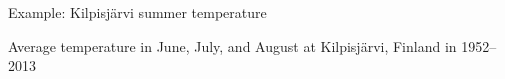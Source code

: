 \documentclass[english,t]{beamer}
\begin{document}
\begin{frame}{Example: Kilpisjärvi summer temperature}

  Average temperature in June, July, and August at Kilpisjärvi,
  Finland in 1952--2013

  \begin{center}
  \end{center}

\end{frame}
\end{document}
